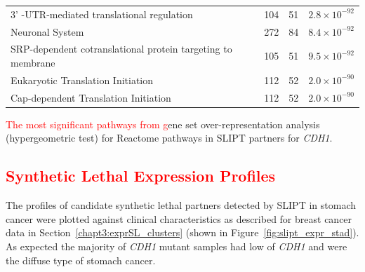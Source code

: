 \begin{table}[!htbp]
{\begin{threeparttable}
\begin{tabular}{lccc}
  3' -UTR-mediated translational regulation & 104 &  51 & $2.8 \times 10^{-92}$ \\ 
  \rowcolor{black!10}
  Neuronal System & 272 &  84 & $8.4 \times 10^{-92}$ \\ 
  \rowcolor{black!5}
  SRP-dependent cotranslational protein targeting to membrane & 105 &  51 & $9.5 \times 10^{-92}$ \\ 
  \rowcolor{black!10}
  Eukaryotic Translation Initiation & 112 &  52 & $2.0 \times 10^{-90}$ \\ 
  \rowcolor{black!5}
  Cap-dependent Translation Initiation & 112 &  52 & $2.0 \times 10^{-90}$ \\ 
   \hline
\end{tabular}
\begin{tablenotes}
\raggedright %
\textcolor{red}{The most significant pathways from g}ene set over-representation analysis (hypergeometric test) for Reactome pathways in \gls{SLIPT} partners for \textit{CDH1}.
\end{tablenotes}
\end{threeparttable}
}
\end{table}




\subsection{\textcolor{red}{Synthetic Lethal Expression Profiles}} \label{chapt3:stad_SL_clusters}

The  profiles of candidate \gls{synthetic lethal} partners detected by \gls{SLIPT} in stomach cancer were plotted against clinical characteristics as described for breast cancer data in Section~\ref{chapt3:exprSL_clusters} (shown in Figure~\ref{fig:slipt_expr_stad}). As expected the majority of \textit{CDH1} \gls{mutant} samples had low  of \textit{CDH1} and were the diffuse type of stomach cancer.

